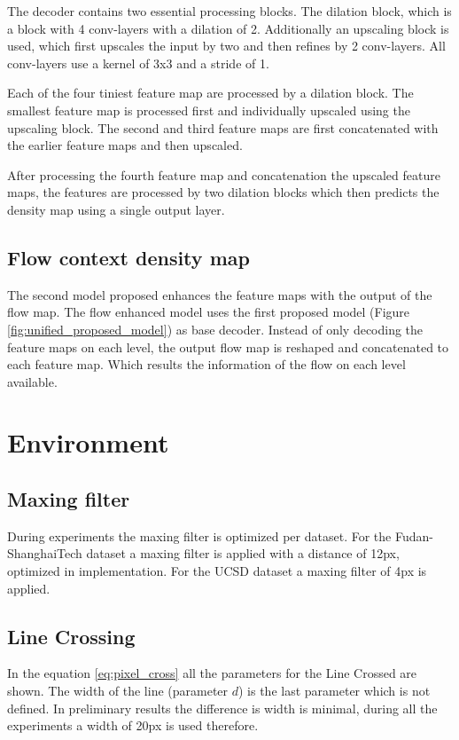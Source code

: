 The decoder contains two essential processing blocks. The dilation block, which is a block with 4 conv-layers with a dilation of 2. Additionally an upscaling block is used, which first upscales the input by two and then refines by 2 conv-layers. All conv-layers use a kernel of 3x3 and a stride of 1.

Each of the four tiniest feature map are processed by a dilation block. The smallest feature map is processed first and individually upscaled using the upscaling block. The second and third feature maps are first concatenated with the earlier feature maps and then upscaled.

After processing the fourth feature map and concatenation the upscaled feature maps, the features are processed by two dilation blocks which then predicts the density map using a single output layer.



\subsection{Flow context density map}
The second model proposed enhances the feature maps with the output of the flow map. The flow enhanced model uses the first proposed model (Figure \ref{fig:unified_proposed_model}) as base decoder. Instead of only decoding the feature maps on each level, the output flow map is reshaped and concatenated to each feature map. Which results the information of the flow on each level available.


\section{Environment}

\subsection{Maxing filter}
During experiments the maxing filter is optimized per dataset. For the Fudan-ShanghaiTech dataset a maxing filter is applied with a distance of 12px, optimized in implementation. For the UCSD dataset a maxing filter of 4px is applied.

\subsection{Line Crossing}
In the equation \ref{eq:pixel_cross} all the parameters for the Line Crossed are shown. The width of the line (parameter $d$) is the last parameter which is not defined. In preliminary results the difference is width is minimal, during all the experiments a width of 20px is used therefore.


